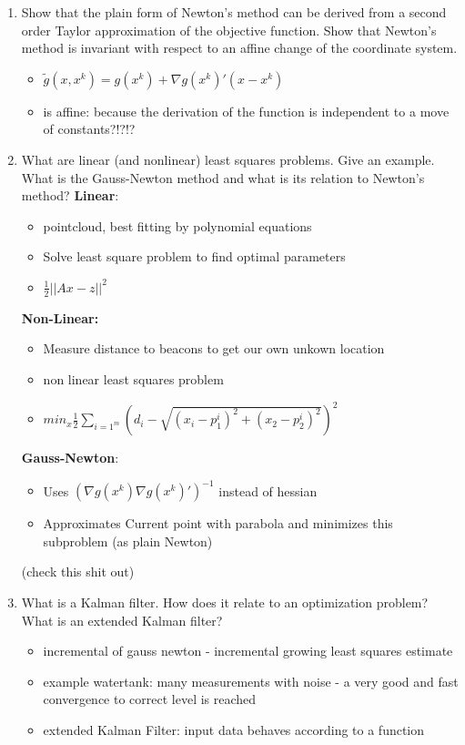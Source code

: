 \documentclass{report}
\newcommand{\question}[1]{{\small\textsf{#1}}}
\begin{document}
\begin{enumerate}
\item \question{Show that the plain form of Newton’s method can be derived from a second order
    Taylor approximation of the objective function. Show that Newton’s method is invariant with
    respect to an affine change of the coordinate system.}
  \begin{itemize}
  \item $\tilde{g}(x, x^k) = g(x^k) + \nabla g(x^k)'(x - x^k)$
  \item is affine: because the derivation of the function is independent to a move of constants?!?!?
  \end{itemize}
\item \question{What are linear (and nonlinear) least squares problems. Give an example.  What is
    the Gauss-Newton method and what is its relation to Newton’s method?}
  \textbf{Linear}:
\begin{itemize}
	\item pointcloud, best fitting by polynomial equations
	\item Solve least square problem to find optimal parameters
	\item $\frac{1}{2}|| Ax - z ||^2$
\end{itemize} 
\textbf{Non-Linear:}
\begin{itemize}
	\item Measure distance to beacons to get our own unkown location
	\item non linear least squares problem
	\item $min_x \frac{1}{2} \sum_{i = 1^m} (d_i - \sqrt{(x_i - p_1^i)^2 + (x_2 - p_2^i)^2})^2$
\end{itemize} 
\textbf{Gauss-Newton}:
\begin{itemize}
	\item Uses $(\nabla g(x^k)\nabla g(x^k)')^{-1}$ instead of hessian
	\item Approximates Current point with parabola and minimizes this subproblem (as plain Newton)
\end{itemize}
(check this shit out)
\item \question{What is a Kalman filter. How does it relate to an optimization problem?  What is an
    extended Kalman filter?}
  \begin{itemize}
	\item incremental of gauss newton - incremental growing least squares estimate
	\item example watertank: many measurements with noise - a very good and fast convergence to correct level is reached
	\item extended Kalman Filter: input data behaves according to a function
\end{itemize}


\end{enumerate}
\end{document}
